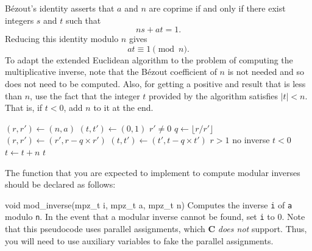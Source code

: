 B\'ezout's identity asserts that $a$ and $n$ are coprime if and only if
there exist integers $s$ and $t$ such that
\[
  n s + a t = 1.
\]
Reducing this identity modulo $n$ gives
\[
  a t \equiv 1 \pmod{n}.
\]
To adapt the extended Euclidean algorithm to the problem of computing
the multiplicative inverse, note that the B\'ezout coefficient of $n$ is
not needed and so does not need to be computed. Also, for getting a
positive and result that is less than $n$,  use the fact that the
integer $t$ provided by the algorithm satisfies $| t | < n$. That is, if
$t < 0$, add $n$ to it at the end.

\begin{codebox}
  \li $(r, r') \gets (n, a)$
  \li $(t, t') \gets (0, 1)$
  \li \While $r' \ne 0$
  \li \Then $q \gets \lfloor r / r' \rfloor$
  \li       $(r, r') \gets (r', r - q \times r')$
  \li       $(t, t') \gets (t', t - q \times t')$
      \End
  \li \If $r > 1$ \li \Then \Return no inverse \End
  \li \If $t < 0$ \li \Then $t \gets t + n$ \End
  \li \Return $t$
\end{codebox}

The function that you are expected to implement to compute modular
inverses should be declared as follows:

\begin{funcdoc}{void mod\_inverse(mpz\_t i, mpz\_t a, mpz\_t n)}
  Computes the inverse \texttt{i} of \texttt{a} modulo \texttt{n}. In
  the event that a modular inverse cannot be found, set \texttt{i} to 0.
  Note that this pseudocode uses parallel assignments, which \textbf{C}
  \emph{does not} support. Thus, you will need to use auxiliary
  variables to fake the parallel assignments.
\end{funcdoc}
